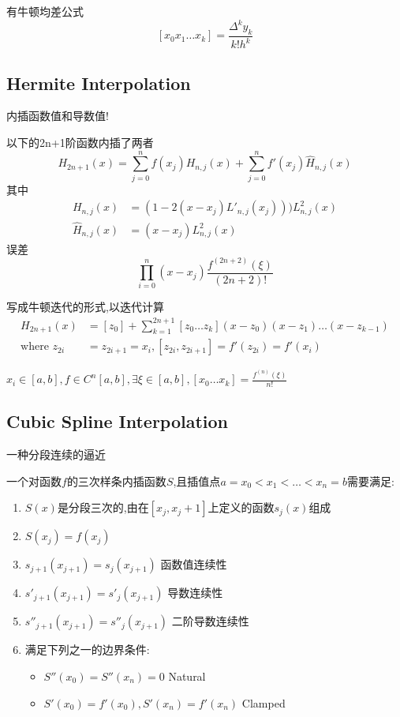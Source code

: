 \documentclass{article}
\begin{document}
有牛顿均差公式
$$
    [x_0x_1\dots x_k]=\frac{\Delta^k y_k}{k! h^k}
$$

\subsection{Hermite Interpolation}

 内插函数值和导数值!

以下的2n+1阶函数内插了两者
$$
    H_{2n+1}(x)
    =\sum_{j=0}^n f(x_j)H_{n,j}(x)+
    \sum_{j=0}^n f'(x_j)\widehat H_{n,j}(x)
$$
其中
$$
    \begin{aligned}
        H_{n,j}(x)          & = (1-2(x-x_j)L'_{n,j}(x_j)))L^2_{n,j}(x) \\
        \widehat H_{n,j}(x) & = (x-x_j)L^2_{n,j}(x)
    \end{aligned}
$$
误差
$$
    \prod_{i=0}^n(x-x_j)\frac{f^{(2n+2)}(\xi)}{(2n+2)!}
$$

写成牛顿迭代的形式,以迭代计算
$$
    \begin{aligned}
        H_{2n+1}(x)
                            & =[z_0]+\sum_{k=1}^{2n+1} [z_0\dots z_k](x-z_0)(x-z_1)\dots(x-z_{k-1}) \\
        \text{where }z_{2i} & =z_{2i+1}=x_i, [z_{2i},z_{2i+1}]=f'(z_{2i})=f'(x_i)
    \end{aligned}
$$

\trm $x_i\in[a,b], f\in C^n[a,b],\exists \xi \in [a,b], [x_0\dots x_k]=\frac{f^{(n)}(\xi)}{n!}$

\subsection{Cubic Spline Interpolation}

一种分段连续的逼近

 一个对函数$f$的三次样条内插函数$S$,且插值点$a=x_0<x_1<\dots < x_n=b$需要满足:
\begin{enumerate}
    \item $S(x)$是分段三次的,由在$[x_j,x_j+1]$上定义的函数$s_j(x)$组成
    \item $S(x_j)=f(x_j)$
    \item $s_{j+1}(x_{j+1})=s_j(x_{j+1})$ 函数值连续性
    \item $s'_{j+1}(x_{j+1})=s'_j(x_{j+1})$ 导数连续性
    \item $s''_{j+1}(x_{j+1})=s''_j(x_{j+1})$ 二阶导数连续性
    \item 满足下列之一的边界条件:
          \begin{itemize}
              \item $S''(x_0)=S''(x_n)=0$ Natural
              \item $S'(x_0)=f'(x_0),S'(x_n)=f'(x_n)$ Clamped
          \end{itemize}
\end{enumerate}
\end{document}
